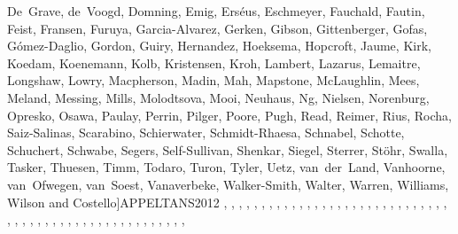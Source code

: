\documentclass[12pt,authoryear]{elsarticle}
\begin{document}
\begin{thebibliography}{73}
{{  De Grave, de Voogd, Domning, Emig, Erséus, Eschmeyer, Fauchald, Fautin,
  Feist, Fransen, Furuya, Garcia-Alvarez, Gerken, Gibson, Gittenberger, Gofas,
  Gómez-Daglio, Gordon, Guiry, Hernandez, Hoeksema, Hopcroft, Jaume, Kirk,
  Koedam, Koenemann, Kolb, Kristensen, Kroh, Lambert, Lazarus, Lemaitre,
  Longshaw, Lowry, Macpherson, Madin, Mah, Mapstone, McLaughlin, Mees, Meland,
  Messing, Mills, Molodtsova, Mooi, Neuhaus, Ng, Nielsen, Norenburg, Opresko,
  Osawa, Paulay, Perrin, Pilger, Poore, Pugh, Read, Reimer, Rius, Rocha,
  Saiz-Salinas, Scarabino, Schierwater, Schmidt-Rhaesa, Schnabel, Schotte,
  Schuchert, Schwabe, Segers, Self-Sullivan, Shenkar, Siegel, Sterrer, Stöhr,
  Swalla, Tasker, Thuesen, Timm, Todaro, Turon, Tyler, Uetz, van der Land,
  Vanhoorne, van Ofwegen, van Soest, Vanaverbeke, Walker-Smith, Walter,
  Warren, Williams, Wilson and Costello}]{APPELTANS2012}
, ,
  , ,
  , ,
  , ,
  , ,
  , ,
  , ,
  , ,
  , ,
  , ,
  , ,
  , ,
  , ,
  , ,
  , ,
  , ,
  , ,
  , ,
  , ,
  , ,
  , ,
  , ,
  , ,
  , ,
  , ,
  , ,
  , ,
}
\end{thebibliography}
\end{document}
